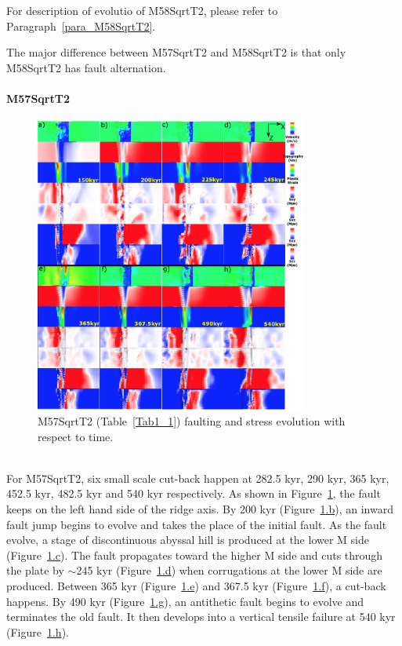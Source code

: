 For description of evolutio of M58SqrtT2, please refer to Paragraph~\hyperref[para_M58SqrtT2]{\ref{para_M58SqrtT2}}.

The major difference between M57SqrtT2 and M58SqrtT2 is that only M58SqrtT2 has fault alternation.

\paragraph{M57SqrtT2}

\begin{figure}[h]
 \centering
  \includegraphics[width=0.8\textwidth]{./Figures/fig_Results_MRange_3_M57SqrtT2_time_evolution.eps}
 \caption{M57SqrtT2 (Table~\hyperref[Tab1_1]{\ref{Tab1_1}}) faulting and stress evolution with respect to time.}
\label{fig_Results_MRange_3}
\end{figure}

~\\
For M57SqrtT2, six small scale cut-back happen at 282.5 kyr, 290 kyr, 365 kyr, 452.5 kyr, 482.5 kyr and 540 kyr respectively. As shown in Figure~\hyperref[fig_Results_MRange_3]{\ref{fig_Results_MRange_3}}, the fault keeps on the left hand side of the ridge axis. By 200 kyr (Figure~\hyperref[fig_Results_MRange_3]{\ref{fig_Results_MRange_3}.b}), an inward fault jump begins to evolve and takes the place of the initial fault. As the fault evolve, a stage of discontinuous abyssal hill is produced at the lower M side (Figure~\hyperref[fig_Results_MRange_3]{\ref{fig_Results_MRange_3}.c}). The fault propagates toward the higher M side and cuts through the plate by $\sim$245 kyr (Figure~\hyperref[fig_Results_MRange_3]{\ref{fig_Results_MRange_3}.d}) when corrugations at the lower M side are produced. Between 365 kyr (Figure~\hyperref[fig_Results_MRange_3]{\ref{fig_Results_MRange_3}.e}) and 367.5 kyr (Figure~\hyperref[fig_Results_MRange_3]{\ref{fig_Results_MRange_3}.f}), a cut-back happens. By 490 kyr (Figure~\hyperref[fig_Results_MRange_3]{\ref{fig_Results_MRange_3}.g}), an antithetic fault begins to evolve and terminates the old fault. It then develops into a vertical tensile failure at 540 kyr (Figure~\hyperref[fig_Results_MRange_3]{\ref{fig_Results_MRange_3}.h}).
